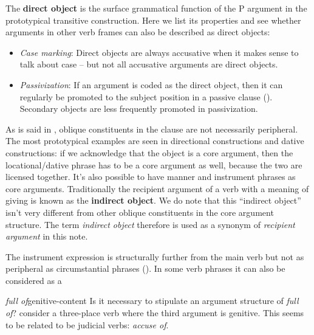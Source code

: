 \documentclass[a4paper, oneside, 12pt]{report}
\newcommand*{\concept}[1]{\textbf{#1}}
\newcommand*{\term}[1]{\emph{#1}}
\newcommand{\form}[1]{\emph{#1}}
\begin{document}
The \concept{direct object} is the surface grammatical function of the P argument
in the prototypical transitive construction.
Here we list its properties and see whether arguments in other verb frames 
can also be described as direct objects:
\begin{itemize}
    \item \emph{Case marking}: Direct objects are always accusative when it makes sense to talk about case -- 
    but not all accusative arguments are direct objects. 

    \item \emph{Passivization}: If an argument is coded as the direct object, 
    then it can regularly be promoted to the subject position in a passive clause
    (). 
    Secondary objects are less frequently promoted in passivization. 
\end{itemize}

As is said in ,
oblique constituents in the clause are not necessarily peripheral.
The most prototypical examples are seen in directional constructions and dative constructions:
if we acknowledge that the object is a core argument,
then the locational/dative phrase has to be a core argument as well,
because the two are licensed together.
It's also possible to have manner and instrument phrases as core arguments.
Traditionally the recipient argument of a verb with a meaning of giving
is known as the \concept{indirect object}.
We do note that this ``indirect object'' isn't very different from 
other oblique constituents in the core argument structure.
The term \term{indirect object} therefore is used as a synonym of \term{recipient argument} in this note.

The instrument expression is structurally further from the main verb
but not as peripheral as circumstantial phrases
().
In some verb phrases it can also be considered as a 

\begin{todobox}{\form{full of}}{genitive-content}
    Is it necessary to stipulate an argument structure of \form{full of}?
    consider a three-place verb where the third argument is genitive.
    This seems to be related to be judicial verbs:
    \form{accuse of}.
\end{todobox}
\end{document}
